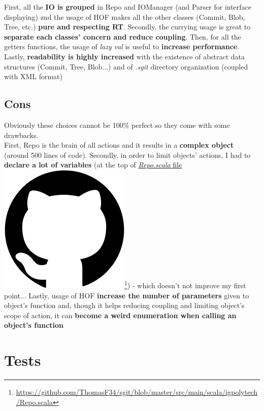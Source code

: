 \documentclass[11pt]{article}
\begin{document}
First, all the \textbf{IO is grouped} in Repo and IOManager (and Parser for interface displaying) znd the usage of HOF makes all the other classes (Commit, Blob, Tree, etc.) \textbf{pure and respecting RT}.
Secondly, the currying usage is great to \textbf{separate each classes' concern and reduce coupling}.
Then, for all the getters functions, the usage of \textit{lazy val} is useful to \textbf{increase performance}.
Lastly, \textbf{readability is highly increased} with the existence of abstract data structures (Commit, Tree, Blob...) and of \textit{.sgit} directory organization (coupled with XML format)

\subsection{Cons}
Obviously these choices cannot be 100\% perfect so they come with some drawbacks.\\

First, Repo is the brain of all actions and it results in a \textbf{complex object} (around 500 lines of code).
Secondly, in order to limit objects' actions, I had to \textbf{declare a lot of variables} (at the top of \href{https://github.com/ThomasF34/sgit/blob/master/src/main/scala/igpolytech/Repo.scala}{\textit{Repo.scala} file \includegraphics[height=\fontcharht\font`\l]{img/github.png}}\footnote{\href{https://github.com/ThomasF34/sgit/blob/master/src/main/scala/igpolytech/Repo.scala}{\ul{https://github.com/ThomasF34/sgit/blob/master/src/main/scala/igpolytech/Repo.scala}}}) - which doesn't not improve my first point...
Lastly, usage of HOF \textbf{increase the number of parameters} given to object's function and, though it helps reducing coupling and limiting object's scope of action, it can \textbf{become a weird enumeration when calling an object's function}

\section{Tests}
\end{document}
